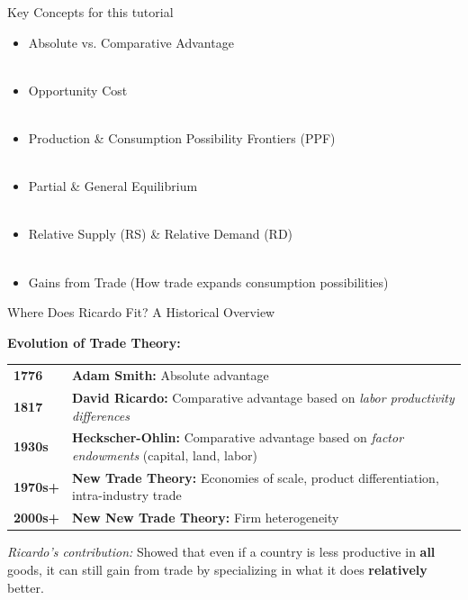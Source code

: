 \documentclass{beamer}
\begin{document}
\begin{frame}{Key Concepts for this tutorial}

\begin{itemize}
    \item Absolute vs. Comparative Advantage \\~\\ 
    \item Opportunity Cost \\~\\
    \item Production \& Consumption Possibility Frontiers (PPF) \\~\\
    \item Partial \& General Equilibrium \\~\\
    \item Relative Supply (RS) \& Relative Demand (RD) \\~\\
    \item Gains from Trade (How trade expands consumption possibilities)
\end{itemize}

\end{frame}




\begin{frame}{Where Does Ricardo Fit? A Historical Overview}

\textbf{Evolution of Trade Theory:}

\vspace{0.3cm}

\begin{tabular}{lp{7cm}}
\textbf{1776} & \textbf{Adam Smith:} Absolute advantage \\[0.2cm]
\textbf{1817} & \textbf{David Ricardo:} Comparative advantage based on \textit{labor productivity differences} \\[0.2cm]
\textbf{1930s} & \textbf{Heckscher-Ohlin:} Comparative advantage based on \textit{factor endowments} (capital, land, labor) \\[0.2cm]
\textbf{1970s+} & \textbf{New Trade Theory:} Economies of scale, product differentiation, intra-industry trade \\[0.2cm]
\textbf{2000s+} & \textbf{New New Trade Theory:} Firm heterogeneity
\end{tabular}

\vspace{0.5cm}

\textit{Ricardo's contribution:} Showed that even if a country is less productive in \textbf{all} goods, it can still gain from trade by specializing in what it does \textbf{relatively} better.

\end{frame}
\end{document}
